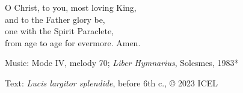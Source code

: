 \hymn



\begin{underhymnverse}
  O Christ, to you, most loving King,\\ 
  and to the Father glory be,\\ 
  one with the Spirit Paraclete,\\
  from age to age for evermore. Amen.
\end{underhymnverse}

\begin{hymnsource}
Music: Mode IV, melody 70; \emph{Liber Hymnarius}, Solesmes, 1983*

Text: \emph{Lucis largitor splendide}, before 6th c., © 2023 ICEL
\end{hymnsource}
